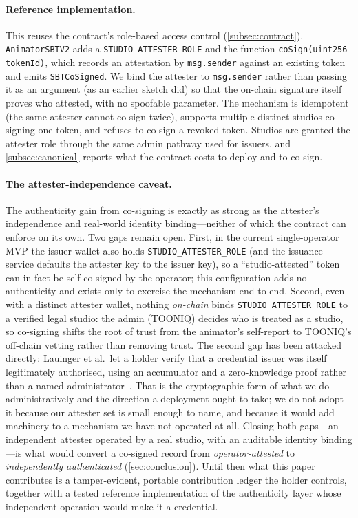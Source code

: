 \paragraph{Reference implementation.}
This reuses the contract's role-based access control (\cref{subsec:contract}). \texttt{AnimatorSBTV2} adds a
\texttt{STUDIO\_ATTESTER\_ROLE} and the function
\texttt{coSign(uint256 tokenId)}, which records an attestation by
\texttt{msg.sender} against an existing token and emits \texttt{SBTCoSigned}.
We bind the attester to \texttt{msg.sender} rather than passing it as an argument
(as an earlier sketch did) so that the on-chain signature itself proves who
attested, with no spoofable parameter. The mechanism is idempotent (the same
attester cannot co-sign twice), supports multiple distinct studios co-signing one
token, and refuses to co-sign a revoked token. Studios are granted the attester role
through the same admin pathway used for issuers, and \cref{subsec:canonical} reports
what the contract costs to deploy and to co-sign.

\paragraph{The attester-independence caveat.}
The authenticity gain from co-signing is exactly as strong as the attester's
independence and real-world identity binding---neither of which the contract can
enforce on its own. Two gaps remain open. First, in the current single-operator MVP
the issuer wallet also holds \texttt{STUDIO\_ATTESTER\_ROLE} (and the issuance
service defaults the attester key to the issuer key), so a ``studio-attested'' token
can in fact be self-co-signed by the operator; this configuration adds no
authenticity and exists only to exercise the mechanism end to end. Second, even with
a distinct attester wallet, nothing \emph{on-chain} binds \texttt{STUDIO\_ATTESTER\_ROLE}
to a verified legal studio: the admin (TOONIQ) decides who is treated as a studio, so
co-signing shifts the root of trust from the animator's self-report to TOONIQ's
off-chain vetting rather than removing trust. The second gap has been attacked
directly: Lauinger et al.\ let a holder verify that a credential issuer was itself
legitimately authorised, using an accumulator and a zero-knowledge proof rather than a
named administrator~\cite{lauinger2021apoa}. That is the cryptographic form of what we
do administratively and the direction a deployment ought to take; we do not adopt it
because our attester set is small enough to name, and because it would add machinery to
a mechanism we have not operated at all. Closing both gaps---an independent attester
operated by a real studio, with an auditable identity binding---is what would convert a
co-signed record from \emph{operator-attested} to \emph{independently authenticated}
(\cref{sec:conclusion}). Until then what this paper contributes is a tamper-evident,
portable contribution ledger the holder controls, together with a tested reference
implementation of the authenticity layer whose independent operation would make it a
credential.

